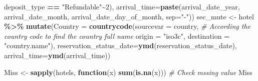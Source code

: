 \documentclass[11pt,a4paper,]{article}
\newenvironment{Shaded}{\begin{snugshade}}{\end{snugshade}}
\newcommand{\CommentTok}[1]{\textcolor[rgb]{0.56,0.35,0.01}{\textit{#1}}}
\newcommand{\ControlFlowTok}[1]{\textcolor[rgb]{0.13,0.29,0.53}{\textbf{#1}}}
\newcommand{\DataTypeTok}[1]{\textcolor[rgb]{0.13,0.29,0.53}{#1}}
\newcommand{\DecValTok}[1]{\textcolor[rgb]{0.00,0.00,0.81}{#1}}
\newcommand{\KeywordTok}[1]{\textcolor[rgb]{0.13,0.29,0.53}{\textbf{#1}}}
\newcommand{\NormalTok}[1]{#1}
\newcommand{\OperatorTok}[1]{\textcolor[rgb]{0.81,0.36,0.00}{\textbf{#1}}}
\newcommand{\StringTok}[1]{\textcolor[rgb]{0.31,0.60,0.02}{#1}}
\begin{document}
\begin{Shaded}
\begin{Highlighting}[]
\NormalTok{                         deposit\_type }\OperatorTok{==}\StringTok{ "Refundable"}\OperatorTok{\textasciitilde{}}\DecValTok{2}\NormalTok{),}
   \DataTypeTok{arrival\_time=}\KeywordTok{paste}\NormalTok{(arrival\_date\_year,}
\NormalTok{                      arrival\_date\_month,}
\NormalTok{                      arrival\_date\_day\_of\_month,}
                      \DataTypeTok{sep=}\StringTok{"{-}"}\NormalTok{))}
\NormalTok{  sec\_mute \textless{}{-}}\StringTok{ }\NormalTok{hotel }\OperatorTok{\%\textgreater{}\%}\StringTok{ }\KeywordTok{mutate}\NormalTok{(}\DataTypeTok{Country =} \KeywordTok{countrycode}\NormalTok{(}\DataTypeTok{sourcevar =}\NormalTok{ country,              }\CommentTok{\# According the country code to find the country full name}
                                      \DataTypeTok{origin =} \StringTok{"iso3c"}\NormalTok{,}
                                      \DataTypeTok{destination =} \StringTok{"country.name"}\NormalTok{),}
          \DataTypeTok{reservation\_status\_date=}\KeywordTok{ymd}\NormalTok{(reservation\_status\_date),}
         \DataTypeTok{arrival\_time=}\KeywordTok{ymd}\NormalTok{(arrival\_time)) }
\end{Highlighting}
\end{Shaded}

\begin{Shaded}
\begin{Highlighting}[]
\NormalTok{Miss \textless{}{-}}\StringTok{ }\KeywordTok{sapply}\NormalTok{(hotels, }\ControlFlowTok{function}\NormalTok{(x) }\KeywordTok{sum}\NormalTok{(}\KeywordTok{is.na}\NormalTok{(x))) }\CommentTok{\# Check mssing value }
\NormalTok{Miss}
\end{Highlighting}
\end{Shaded}
\end{document}
